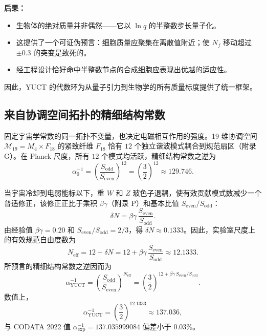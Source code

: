 \documentclass[12pt,a4paper]{article}
\begin{document}
	\textbf{后果：}
	\begin{itemize}
		\item 生物体的绝对质量并非偶然——它以 \(\ln q\) 的半整数步长量子化。
		\item 这提供了一个可证伪预言：细胞质量应聚集在离散值附近；使 \(N_f\) 移动超过 \(\pm0.3\) 的突变是致死的。
		\item 经工程设计恰好命中半整数节点的合成细胞应表现出优越的适应性。
	\end{itemize}
	
	因此，YUCT 的代数环为从量子引力到生物学的所有质量标度提供了统一框架。
	
	\subsection{来自协调空间拓扑的精细结构常数}
	\label{subsec:alpha-topology}
	
	固定宇宙学常数的同一拓扑不变量，也决定电磁相互作用的强度。19 维协调空间 \(\mathcal{M}_{19}=M_4\times F_{18}\) 的紧致纤维 \(F_{18}\) 恰有 \(12\) 个独立谐波模式耦合到规范扇区（附录 G）。在 Planck 尺度，所有 \(12\) 个模式均活跃，精细结构常数之逆为
	\begin{equation}
		\alpha_0^{-1} = \left(\frac{S_{\mathrm{odd}}}{S_{\mathrm{even}}}\right)^{12}
		= \left(\frac{3}{2}\right)^{12} \approx 129.746 .
	\end{equation}
	
	当宇宙冷却到电弱能标以下，重 \(W\) 和 \(Z\) 玻色子退耦，使有效贡献模式数减少一个普适修正，该修正正比于乘积 \(\beta\gamma\)（附录 P）和基本比值 \(S_{\mathrm{even}}/S_{\mathrm{odd}}\)：
	\begin{equation}
		\delta N = \beta\gamma \, \frac{S_{\mathrm{even}}}{S_{\mathrm{odd}}} .
	\end{equation}
	由经验值 \(\beta\gamma = 0.20\) 和 \(S_{\mathrm{even}}/S_{\mathrm{odd}} = 2/3\)，得 \(\delta N \approx 0.1333\)。因此，实验室尺度上的有效规范自由度数为
	\begin{equation}
		N_{\mathrm{eff}} = 12 + \delta N = 12 + \beta\gamma\,\frac{S_{\mathrm{even}}}{S_{\mathrm{odd}}}
		\approx 12.1333 .
	\end{equation}
	所预言的精细结构常数之逆因而为
	\begin{equation}
		\boxed{\alpha^{-1}_{\mathrm{YUCT}} =
			\left(\frac{S_{\mathrm{odd}}}{S_{\mathrm{even}}}\right)^{N_{\mathrm{eff}}}
			= \left(\frac{3}{2}\right)^{12 + \beta\gamma\,S_{\mathrm{even}}/S_{\mathrm{odd}}} } .
		\label{eq:alpha-yuct}
	\end{equation}
	数值上，
	\[
	\alpha^{-1}_{\mathrm{YUCT}} = \left(\frac{3}{2}\right)^{12.1333} \approx 137.036 ,
	\]
	与 CODATA 2022 值 \(\alpha^{-1}_{\mathrm{exp}} = 137.035999084\) 偏差小于 \(0.03\%\)。
	
\end{document}
